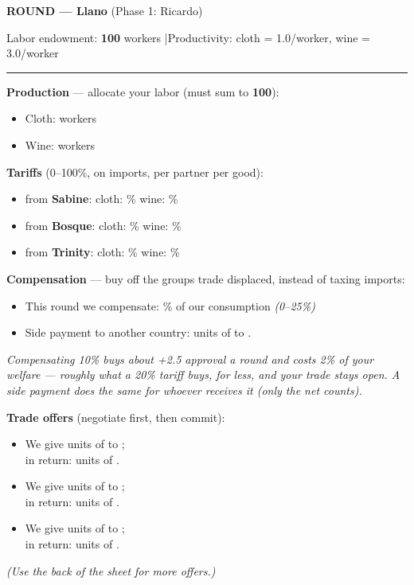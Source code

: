 \documentclass[11pt]{article}
\newcommand{\blank}[1]{\underline{\hspace{#1}}}
\newcommand{\hr}{\par\vspace{2pt}\noindent\rule{\linewidth}{0.4pt}\par\vspace{2pt}}
\begin{document}
\newpage

{\large\bfseries ROUND \blank{1cm} --- Llano} \hfill (Phase 1: Ricardo)\par
Labor endowment: \textbf{100} workers \quad|\quad Productivity: cloth = 1.0/worker, wine = 3.0/worker
\hr

{\bfseries Production} --- allocate your labor (must sum to \textbf{100}):\par
\begin{itemize}[nosep,leftmargin=1.4em]
  \item Cloth: \blank{2.5cm} workers
  \item Wine: \blank{2.5cm} workers
\end{itemize}

\vspace{4pt}
{\bfseries Tariffs} (0--100\%, on imports, per partner per good):\par
\begin{itemize}[nosep,leftmargin=1.4em]
  \item from \textbf{Sabine}: \quad cloth: \blank{1.4cm}\% \quad wine: \blank{1.4cm}\%
  \item from \textbf{Bosque}: \quad cloth: \blank{1.4cm}\% \quad wine: \blank{1.4cm}\%
  \item from \textbf{Trinity}: \quad cloth: \blank{1.4cm}\% \quad wine: \blank{1.4cm}\%
\end{itemize}

\vspace{4pt}
{\bfseries Compensation} --- buy off the groups trade displaced, instead of taxing imports:\par
\begin{itemize}[nosep,leftmargin=1.4em]
  \item This round we compensate: \blank{1.4cm}\% of our consumption \quad \textit{(0--25\%)}
  \item Side payment to another country: \blank{1.6cm} units of \blank{2cm} to \blank{2.2cm}.
\end{itemize}
\textit{Compensating 10\% buys about +2.5 approval a round and costs 2\% of your welfare --- roughly what a 20\% tariff buys, for less, and your trade stays open. A side payment does the same for whoever receives it (only the net counts).}

\vspace{4pt}
{\bfseries Trade offers} (negotiate first, then commit):\par
\begin{itemize}[itemsep=4pt,leftmargin=1.4em]
  \item We give \blank{1.8cm} units of \blank{2.2cm} to \blank{2.2cm};\\[2pt] in return: \blank{1.8cm} units of \blank{2.2cm}.
  \item We give \blank{1.8cm} units of \blank{2.2cm} to \blank{2.2cm};\\[2pt] in return: \blank{1.8cm} units of \blank{2.2cm}.
  \item We give \blank{1.8cm} units of \blank{2.2cm} to \blank{2.2cm};\\[2pt] in return: \blank{1.8cm} units of \blank{2.2cm}.
\end{itemize}
\textit{(Use the back of the sheet for more offers.)}
\end{document}
